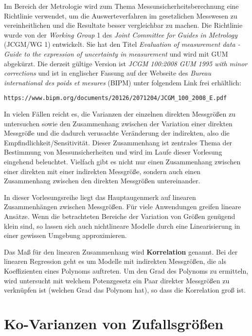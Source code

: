 Im Bereich der Metrologie wird zum Thema Messunsicherheitsberechnung eine Richtlinie verwendet,
um die Auswerteverfahren im gesetzlichen Messwesen zu vereinheitlichen und die Resultate
besser vergleichbar zu machen. Die Richtlinie wurde von der
\textsl{Working Group} 1 des \textsl{Joint Committee for Guides in Metrology} (JCGM/WG 1)
entwickelt. Sie hat den Titel \textsl{Evaluation of measurement
data - Guide to the expression of uncertainty in measurement} und wird mit GUM abgekürzt.
Die derzeit gültige Version ist
\textsl{JCGM 100:2008 GUM 1995 with minor corrections} und ist in englischer Fassung
auf der Webseite des \textsl{Bureau international des poids et mesures} (BIPM)
unter folgendem Link frei erhältlich:
\begin{verbatim}
https://www.bipm.org/documents/20126/2071204/JCGM_100_2008_E.pdf
\end{verbatim}

In vielen Fällen reicht es, die Varianzen der einzelnen direkten Messgrößen zu untersuchen sowie
den Zusammenhang zwischen der Variation einer direkten Messgröße und die dadurch verusachte
Veränderung der indirekten, also die Empfindlichkeit/Sensitivität.
Dieser Zusammenhang ist zentrales Thema der Bestimmung von Messunsicherheiten
und wird im Laufe dieser Vorlesung eingehend beleuchtet.
Vielfach gibt es nicht nur einen Zusammenhang zwischen einer direkten mit einer indirekten Messgröße,
sondern auch einen Zusammenhang zwischen den direkten Messgrößen untereinander.

In dieser Vorlesungsreihe liegt das Hauptaugenmerk auf linearen Zusammenhängen zwischen Messgrößen.
Für viele Anwendungen greifen lineare Ansätze. Wenn die betrachteten Bereiche der Variation von Größen
genügend klein sind, so lassen sich auch nichtlineare Modelle durch eine Linearisierung in einer gewissen
Umgebung approximieren.

Das Maß für den linearen Zusammenhang wird \textbf{Korrelation} genannt.
Bei der linearen Regression geht es um Modelle mit indirekten Messgrößen,
die als Koeffizienten eines Polynoms auftreten. Um den Grad des Polynoms zu ermitteln, wird untersucht
mit welchem Potenzgesetz ein Paar direkter Messgrößen zu verknüpfen ist (welchen Grad das Polynom hat),
so dass die Korrelation groß ist.


\section{Ko-Varianzen von Zufallsgrößen}
\label{Kap1Kovarianzen}

